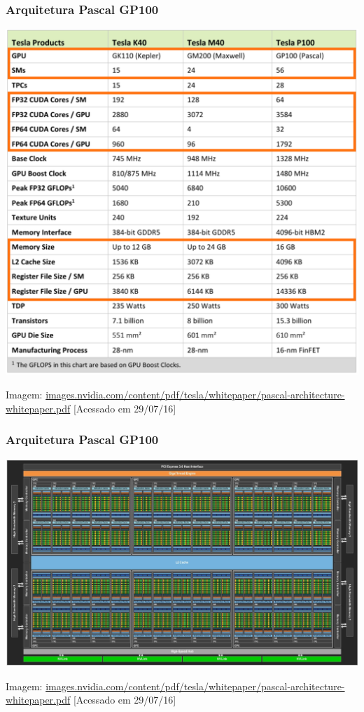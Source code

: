 \documentclass[10pt, compress]{beamer}
\begin{document}
\begin{frame}
    \frametitle{Arquitetura Pascal GP100}
    \centering
    \includegraphics[width=.7\textwidth]{gp100_stats_highlight}
    \hfill

    \tiny{Imagem: \url{images.nvidia.com/content/pdf/tesla/whitepaper/pascal-architecture-whitepaper.pdf} [Acessado em 29/07/16]}
\end{frame}

\begin{frame}
    \frametitle{Arquitetura Pascal GP100}
    \centering
    \includegraphics[width=.95\textwidth]{gp100_diagram}
    \hfill

    \tiny{Imagem: \url{images.nvidia.com/content/pdf/tesla/whitepaper/pascal-architecture-whitepaper.pdf} [Acessado em 29/07/16]}
\end{frame}

\maketitle
\end{document}
